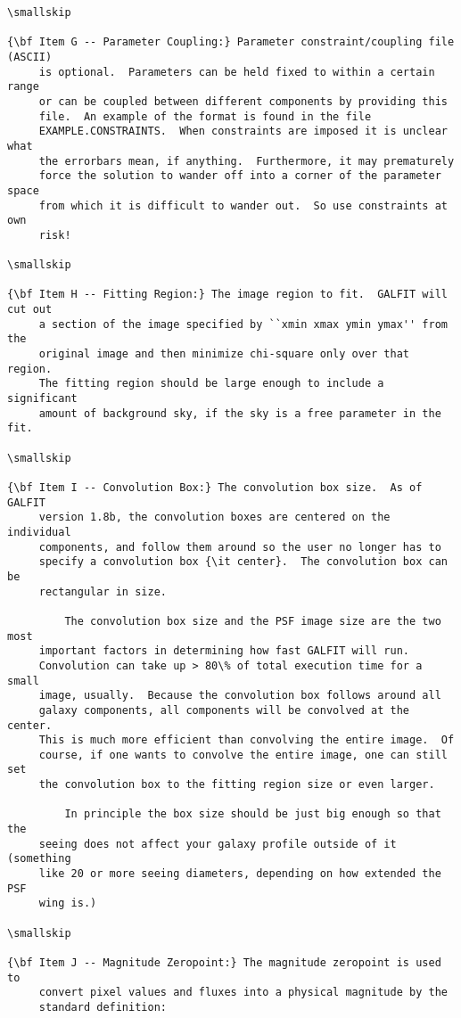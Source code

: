 \documentclass[preprint]{aastex}
\begin{document}
\begin {verbatim}
\smallskip

{\bf Item G -- Parameter Coupling:} Parameter constraint/coupling file (ASCII)
	 is optional.  Parameters can be held fixed to within a certain range
	 or can be coupled between different components by providing this
	 file.  An example of the format is found in the file
	 EXAMPLE.CONSTRAINTS.  When constraints are imposed it is unclear what
	 the errorbars mean, if anything.  Furthermore, it may prematurely
	 force the solution to wander off into a corner of the parameter space
	 from which it is difficult to wander out.  So use constraints at own
	 risk!

\smallskip

{\bf Item H -- Fitting Region:} The image region to fit.  GALFIT will cut out
	 a section of the image specified by ``xmin xmax ymin ymax'' from the
	 original image and then minimize chi-square only over that region.
	 The fitting region should be large enough to include a significant
	 amount of background sky, if the sky is a free parameter in the fit.

\smallskip

{\bf Item I -- Convolution Box:} The convolution box size.  As of GALFIT
	 version 1.8b, the convolution boxes are centered on the individual
	 components, and follow them around so the user no longer has to
	 specify a convolution box {\it center}.  The convolution box can be
	 rectangular in size.

         The convolution box size and the PSF image size are the two most
	 important factors in determining how fast GALFIT will run.
	 Convolution can take up > 80\% of total execution time for a small
	 image, usually.  Because the convolution box follows around all
	 galaxy components, all components will be convolved at the center.
	 This is much more efficient than convolving the entire image.  Of
	 course, if one wants to convolve the entire image, one can still set
	 the convolution box to the fitting region size or even larger.

         In principle the box size should be just big enough so that the
	 seeing does not affect your galaxy profile outside of it (something
	 like 20 or more seeing diameters, depending on how extended the PSF
	 wing is.)

\smallskip

{\bf Item J -- Magnitude Zeropoint:} The magnitude zeropoint is used to
	 convert pixel values and fluxes into a physical magnitude by the
	 standard definition:


\end{verbatim}
\end{document}
